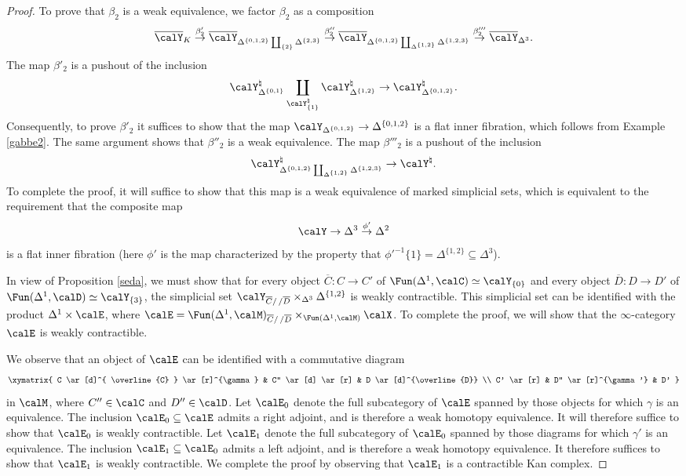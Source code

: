 \begin{proof}
To prove that $\beta_2$ is a weak equivalence, we factor $\beta_{2}$ as a composition
$$ \overline{\calY}_{K} \stackrel{\beta'_{2}}{\rightarrow}
\overline{\calY}_{ \Delta^{ \{0,1,2\} } \coprod_{ \{2\} } \Delta^{ \{2,3\} }}
\stackrel{ \beta''_{2}}{\rightarrow} \overline{\calY}_{ \Delta^{ \{0,1,2\}}
\coprod_{ \Delta^{ \{1,2\} } } \Delta^{ \{1,2,3\} }} \stackrel{\beta'''_{2}}{\rightarrow} \overline{\calY}_{\Delta^3}.$$
The map $\beta'_{2}$ is a pushout of the inclusion
$$\calY^{\natural}_{ \Delta^{ \{0,1\} }} \coprod_{ \calY_{ \{1\}}^{\natural}}
\calY^{\natural}_{ \Delta^{ \{1,2\} }} \rightarrow \calY^{\natural}_{ \Delta^{ \{0,1,2\}}}.$$
Consequently, to prove $\beta'_{2}$ it suffices to show that the map
$\calY_{ \Delta^{ \{0,1,2\} }} \rightarrow \Delta^{ \{0,1,2\} }$ is a flat inner fibration, which
follows from Example \ref{gabbe2}. The same argument shows that $\beta''_{2}$ is a weak equivalence. 
The map $\beta'''_{2}$ is a pushout of the inclusion
$$\calY^{\natural}_{\Delta^{ \{0,1,2\}}
\coprod_{ \Delta^{ \{1,2\} } } \Delta^{ \{1,2,3\} }} \rightarrow \calY^{\natural}.$$
To complete the proof, it will suffice to show that this map is a weak equivalence of marked simplicial sets, which is equivalent to the requirement that the composite map
$$ \calY \rightarrow \Delta^3 \stackrel{\phi'}{\rightarrow} \Delta^2$$
is a flat inner fibration (here $\phi'$ is the map characterized by the property that ${\phi'}^{-1} \{1\} = \Delta^{ \{1,2\} } \subseteq \Delta^3$). 

In view of Proposition \ref{seda}, we must show that for every object $\overline{C}: C \rightarrow C'$ of
$\Fun( \Delta^1, \calC) \simeq \calY_{ \{0\} }$ and every object $\overline{D}: D \rightarrow D'$ of $\Fun( \Delta^1, \calD) \simeq \calY_{ \{3\} }$, the
simplicial set $\calY_{ \overline{C}/ \, / \overline{D}} \times_{ \Delta^3 } \Delta^{ \{1,2\} }$ is
weakly contractible. This simplicial set can be identified with the product
$\Delta^1 \times \calE$, where $\calE = \Fun( \Delta^1, \calM)_{ \overline{C}/ \, / \overline{D} } \times_{ \Fun( \Delta^1, \calM)} \calX$. To complete the proof, we will show that the $\infty$-category $\calE$ is weakly contractible.

We observe that an object of $\calE$ can be identified with a commutative diagram
$$ \xymatrix{ C \ar[d]^{ \overline{C} } \ar[r]^{\gamma} & C'' \ar[d] \ar[r] & D \ar[d]^{\overline{D}} \\
C' \ar[r] & D'' \ar[r]^{\gamma'} & D' }$$
in $\calM$, where $C'' \in \calC$ and $D'' \in \calD$. Let $\calE_0$ denote the full subcategory
of $\calE$ spanned by those objects for which $\gamma$ is an equivalence. The inclusion
$\calE_0 \subseteq \calE$ admits a right adjoint, and is therefore a weak homotopy equivalence.
It will therefore suffice to show that $\calE_0$ is weakly contractible. Let $\calE_1$ denote the
full subcategory of $\calE_0$ spanned by those diagrams for which $\gamma'$ is an equivalence.
The inclusion $\calE_1 \subseteq \calE_0$ admits a left adjoint, and is therefore a weak homotopy equivalence. It therefore suffices to show that $\calE_1$ is weakly contractible. We complete the proof by observing that $\calE_1$ is a contractible Kan complex.
\end{proof}

